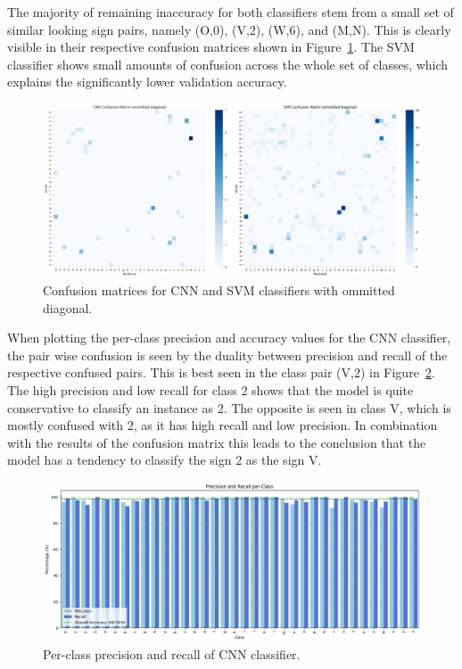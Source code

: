 \documentclass[a4, 10 pt, conference]{ieeeconf}  %
\begin{document}
The majority of remaining inaccuracy for both classifiers stem from a small set of similar
looking sign pairs, namely (O,0), (V,2), (W,6), and (M,N). This is clearly visible
in their respective confusion matrices shown in Figure~\ref{fig:cm}. The SVM 
classifier shows small amounts of confusion across the whole set of classes,
which explains the significantly lower validation accuracy.

\begin{figure}[htb]
  \centering
  \includegraphics[width=\linewidth]{../images/cm_comparison.jpg}
  \caption{Confusion matrices for CNN and SVM classifiers with ommitted diagonal.}
  \label{fig:cm}
\end{figure}

When plotting the per-class precision and accuracy values for the CNN classifier,
the pair wise confusion is seen by the duality between precision and recall of the 
respective confused pairs. This is best seen in the class pair (V,2) in 
Figure~\ref{fig:class_precision_recall}. The high precision and low recall for
class 2 shows that the model is quite conservative to classify an instance as 2. 
The opposite is seen in class V, which is mostly confused with 2, as it has high
recall and low precision. In combination with the results of the confusion matrix
this leads to the conclusion that the model has a tendency to classify the sign 2
as the sign V.

\begin{figure}[htb]
  \centering
  \includegraphics[width=\linewidth]{../images/class_accuracy_cnn.png}
  \caption{Per-class precision and recall of CNN classifier.}
  \label{fig:class_precision_recall}
\end{figure}
\end{document}
